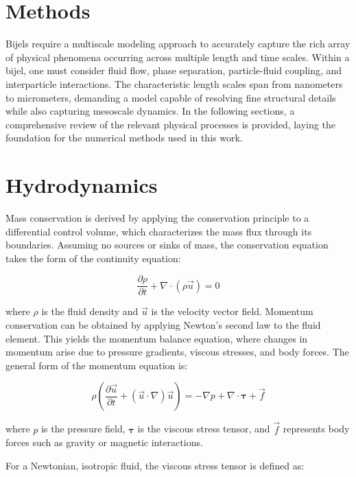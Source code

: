 \section{Methods}
\label{section:methods}

Bijels require a multiscale modeling approach to accurately capture the rich array of physical phenomena 
occurring across multiple length and time scales. Within a bijel, one must consider fluid flow, phase separation, particle-fluid coupling, and interparticle 
interactions. The characteristic length scales span from nanometers to micrometers, demanding a model capable of resolving fine structural details while also 
capturing mesoscale dynamics. In the following sections, a comprehensive review of the relevant physical processes is provided, laying the foundation for the 
numerical methods used in this work.

\section{Hydrodynamics}

Mass conservation is derived by applying the conservation principle to a differential control volume, which characterizes the mass flux through its boundaries. Assuming no sources or sinks of mass, the conservation equation takes the form of the continuity equation:

\begin{equation}
    \frac{\partial\rho}{\partial t} + \nabla\cdot\left(\rho\vec{u}\right) = 0
\end{equation}

where $\rho$ is the fluid density and $\vec{u}$ is the velocity vector field.
Momentum conservation can be obtained by applying Newton's second law to the fluid element. This yields the momentum balance equation, where changes in momentum arise due to pressure gradients, 
viscous stresses, and body forces. The general form of the momentum equation is:

\begin{equation}
    \rho \left(\frac{\partial\vec{u}}{\partial t} + (\vec{u}\cdot\nabla)\vec{u} \right) = -\nabla p + \nabla \cdot \boldsymbol{\tau} + \vec{f}
\end{equation}

where $p$ is the pressure field, $\boldsymbol{\tau}$ is the viscous stress tensor, and $\vec{f}$ represents body forces such as gravity or magnetic interactions.

For a Newtonian, isotropic fluid, the viscous stress tensor is defined as:

